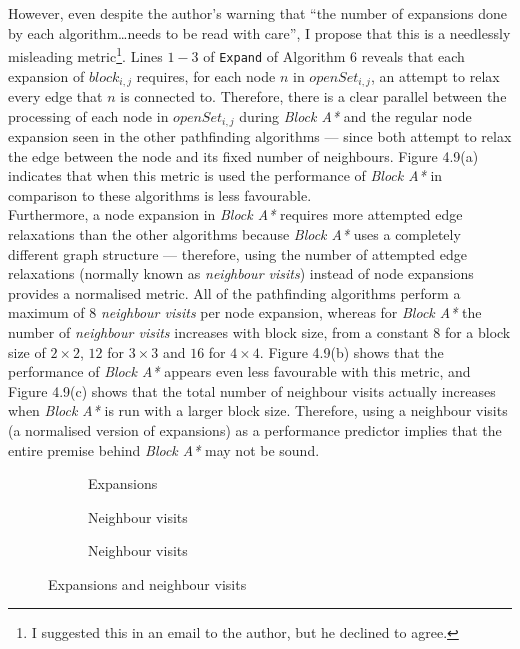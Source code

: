 \documentclass[12pt,notitlepage]{report}
\begin{document}
\noindent
However, even despite the author's warning that ``the number of expansions done by each algorithm\ldots needs to be read with care'', I propose that this is a needlessly misleading metric\footnote{I suggested this in an email to the author, but he declined to agree.}. Lines $1-3$ of {\tt Expand} of Algorithm 6 reveals that each expansion of $block_{i,j}$ requires, for each node $n$ in $openSet_{i,j}$, an attempt to relax every edge that $n$ is connected to. Therefore, there is a clear parallel between the processing of each node in $openSet_{i,j}$ during {\em Block A*} and the regular node expansion seen in the other pathfinding algorithms --- since both attempt to relax the edge between the node and its fixed number of neighbours. Figure 4.9(a) indicates that when this metric is used the performance of {\em Block A*} in comparison to these algorithms is less favourable.\\

\noindent
Furthermore, a node expansion in {\em Block A*} requires more attempted edge relaxations than the other algorithms because {\em Block A*} uses a completely different graph structure --- therefore, using the number of attempted edge relaxations (normally known as {\em neighbour visits}) instead of node expansions provides a normalised metric. All of the pathfinding algorithms perform a maximum of $8$ {\em neighbour visits} per node expansion, whereas for {\em Block A*} the number of {\em neighbour visits} increases with block size, from a constant $8$ for a block size of $2 \times 2$, $12$ for $3\times 3$ and $16$ for $4 \times 4$. Figure 4.9(b) shows that the performance of {\em Block A*} appears even less favourable with this metric, and Figure 4.9(c) shows that the total number of neighbour visits actually increases when {\em Block A*} is run with a larger block size. Therefore, using a neighbour visits (a normalised version of expansions) as a performance predictor implies that the entire premise behind {\em Block A*} may not be sound.\\

\begin{figure}
\centering
  \begin{subfigure}{0.32\textwidth}
  \centering
  
  \caption{Expansions}
  \end{subfigure}
  \begin{subfigure}{0.32\textwidth}
  \centering
  
  \caption{Neighbour visits}
  \end{subfigure}
  \begin{subfigure}{0.32\textwidth}
  \centering
  
  \caption{Neighbour visits}
  \end{subfigure}
\caption{Expansions and neighbour visits}
\end{figure}
\end{document}
